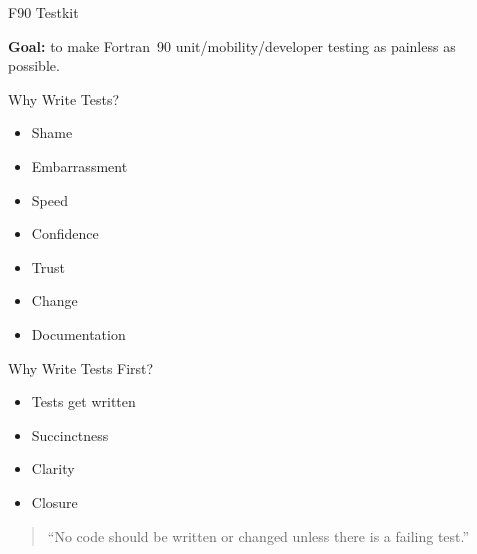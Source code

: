 \documentclass[landscape]{slides}
\begin{document}
\begin{slide}
 \begin{center}
  {\Large F90 Testkit}\\
  \vspace{0.5in}
  \begin{minipage}{6.5in}
    {\bf Goal:} to make Fortran~90 unit/\-mobility/\-developer testing as painless
    as possible.
  \end{minipage}
 \end{center}
\end{slide}
\begin{slide}
  \begin{center}
    {\Large Why Write Tests?}\\
    \vspace{0.5in}
    \begin{minipage}[t]{3in}
     \begin{itemize}
      \item Shame
      \item Embarrassment
      \item Speed
      \item Confidence
     \end{itemize}
    \end{minipage}
    \begin{minipage}[t]{3in}
     \begin{itemize}
      \item Trust
      \item Change
      \item Documentation
     \end{itemize}
    \end{minipage}
  \end{center}
\end{slide}
\begin{slide}
  \begin{center}
    {\Large Why Write Tests First?}\\
    \vspace{0.5in}
    \begin{minipage}{3in}
    \begin{itemize}
     \item Tests get written
     \item Succinctness
     \item Clarity
     \item Closure
    \end{itemize}
    \end{minipage}
    \begin{quotation}
      ``No code should be written or changed unless there is a failing test.''
    \end{quotation}
  \end{center}
\end{slide}
\end{document}
